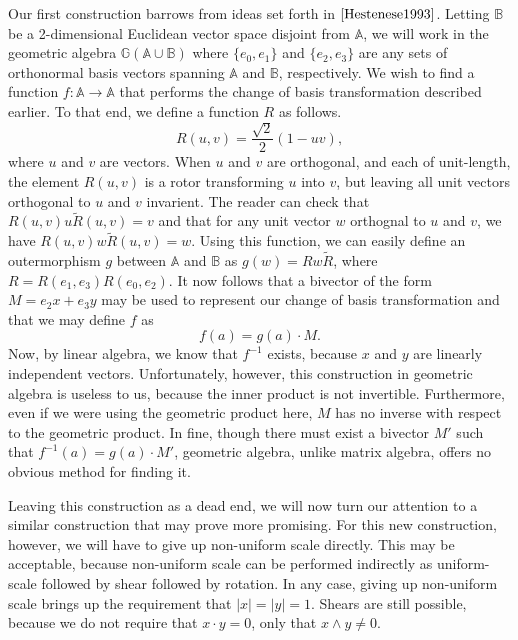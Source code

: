 \documentclass[12pt]{article}
\newcommand{\G}{\mathbb{G}}
\newcommand{\A}{\mathbb{A}}
\newcommand{\B}{\mathbb{B}}
\begin{document}
Our first construction barrows from ideas set forth in $\cite{Hestenese1993}$.
Letting $\B$ be a 2-dimensional Euclidean vector space disjoint from $\A$, we
will work in the geometric algebra $\G(\A\cup\B)$ where $\{e_0,e_1\}$ and $\{e_2,e_3\}$
are any sets of orthonormal basis vectors spanning $\A$ and $\B$, respectively.  We wish to find
a function $f:\A\to\A$ that performs the change of basis transformation
described earlier.  To that end, we define a function $R$ as follows.
\begin{equation*}
R(u,v) = \frac{\sqrt{2}}{2}\left(1 - uv\right),
\end{equation*}
where $u$ and $v$ are vectors.  When $u$ and $v$ are orthogonal, and each of unit-length, the element $R(u,v)$ is
a rotor transforming $u$ into $v$, but leaving all unit vectors orthogonal to
$u$ and $v$ invarient.  The reader can check that $R(u,v)u\tilde{R}(u,v)=v$
and that for any unit vector $w$ orthognal to $u$ and $v$, we have $R(u,v)w\tilde{R}(u,v)=w$.
Using this function, we can easily define an outermorphism $g$ between $\A$
and $\B$ as $g(w)=Rw\tilde{R}$, where $R=R(e_1,e_3)R(e_0,e_2)$.  It now
follows that a bivector of the form $M=e_2x+e_3y$ may be used to represent
our change of basis transformation and that we may define $f$ as
\begin{equation*}
f(a) = g(a)\cdot M.
\end{equation*}
Now, by linear algebra, we know that $f^{-1}$ exists, because $x$ and $y$ are
linearly independent vectors.  Unfortunately, however, this construction in
geometric algebra is useless to us, because the inner product is not invertible.
Furthermore, even if we were using the geometric product here, $M$ has no
inverse with respect to the geometric product.  In fine, though there must exist
a bivector $M'$ such that $f^{-1}(a) = g(a)\cdot M'$, geometric algebra, unlike
matrix algebra, offers no obvious method for finding it.

Leaving this construction as a dead end, we will now turn our attention to
a similar construction that may prove more promising.  For this new construction,
however, we will have to give up non-uniform scale directly.  This may be acceptable,
because non-uniform scale can be performed indirectly as uniform-scale followed by shear followed by rotation.
In any case, giving up non-uniform scale brings up the requirement that $|x|=|y|=1$.
Shears are still possible, because we do not require that $x\cdot y=0$, only that $x\wedge y\neq 0$.
\end{document}
